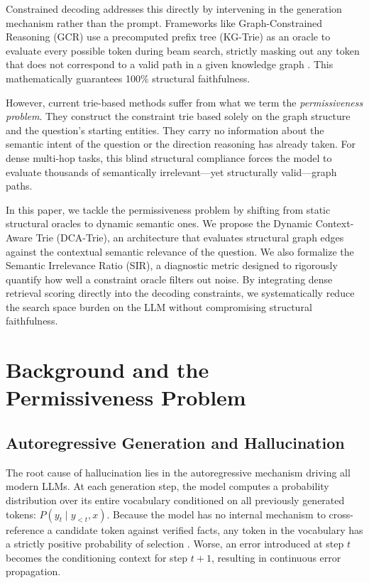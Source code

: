 \documentclass[11pt, letterpaper]{article}
\begin{document}
Constrained decoding addresses this directly by intervening in the generation mechanism rather than the prompt. Frameworks like Graph-Constrained Reasoning (GCR) use a precomputed prefix tree (KG-Trie) as an oracle to evaluate every possible token during beam search, strictly masking out any token that does not correspond to a valid path in a given knowledge graph \citep{luo2025-graph-constrained-reasoning}. This mathematically guarantees 100\% structural faithfulness.

However, current trie-based methods suffer from what we term the \textit{permissiveness problem}. They construct the constraint trie based solely on the graph structure and the question's starting entities. They carry no information about the semantic intent of the question or the direction reasoning has already taken. For dense multi-hop tasks, this blind structural compliance forces the model to evaluate thousands of semantically irrelevant---yet structurally valid---graph paths.

In this paper, we tackle the permissiveness problem by shifting from static structural oracles to dynamic semantic ones. We propose the Dynamic Context-Aware Trie (DCA-Trie), an architecture that evaluates structural graph edges against the contextual semantic relevance of the question. We also formalize the Semantic Irrelevance Ratio (SIR), a diagnostic metric designed to rigorously quantify how well a constraint oracle filters out noise. By integrating dense retrieval scoring directly into the decoding constraints, we systematically reduce the search space burden on the LLM without compromising structural faithfulness.

\section{Background and the Permissiveness Problem}

\subsection{Autoregressive Generation and Hallucination}

The root cause of hallucination lies in the autoregressive mechanism driving all modern LLMs. At each generation step, the model computes a probability distribution over its entire vocabulary conditioned on all previously generated tokens: $P(y_t \mid y_{<t}, x)$. Because the model has no internal mechanism to cross-reference a candidate token against verified facts, any token in the vocabulary has a strictly positive probability of selection \citep{huang2023survey}. Worse, an error introduced at step $t$ becomes the conditioning context for step $t+1$, resulting in continuous error propagation.
\end{document}
